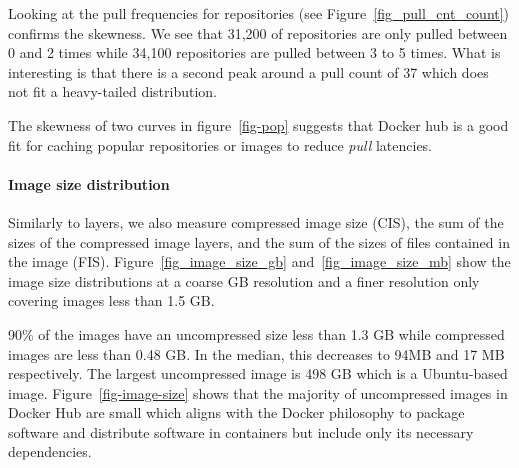 Looking at the pull frequencies for repositories (see Figure~\ref{fig_pull_cnt_count})
confirms the skewness. We see that 31,200 of repositories are only pulled between 0 and
2 times while 34,100 repositories are pulled between 3 to 5 times. What is interesting is
that there is a second peak around a pull count of 37 which does not fit a heavy-tailed
distribution.


The skewness of two curves in figure~\ref{fig-pop} suggests that Docker hub is
a good fit for caching popular repositories or images to
reduce \textit{pull} latencies.


\paragraph{Image size distribution}
\label{sec:image-size}





Similarly to layers, we also measure compressed image size
(CIS), \ie the sum of the sizes of the compressed image layers, and the sum of the
sizes of files contained in the image (FIS). Figure~\ref{fig_image_size_gb}
and~\ref{fig_image_size_mb} show the image size distributions at a coarse GB resolution
and a finer resolution only covering images less than 1.5 GB.

90\% of the images have an uncompressed size less than 1.3 GB while compressed images
are less than 0.48 GB. In the median, this decreases to 94MB and 17 MB respectively.
The largest uncompressed image is 498 GB which is a Ubuntu-based image.
Figure~\ref{fig-image-size} shows that the majority of uncompressed images in Docker Hub are
small which aligns with the Docker philosophy to package software and distribute
software in containers but include only its necessary dependencies.


